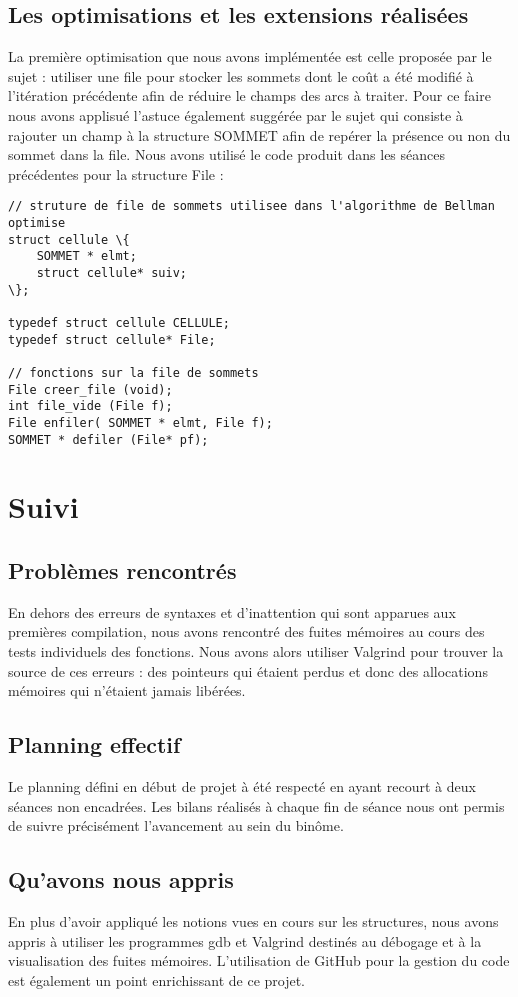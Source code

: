 \documentclass{report}
\begin{document}
\section{Les optimisations et les extensions réalisées}
La première optimisation que nous avons implémentée est celle proposée par le sujet : utiliser une file pour stocker les sommets dont le coût a été modifié à l'itération précédente afin de réduire le champs des arcs à traiter. Pour ce faire nous avons applisué l'astuce également suggérée par le sujet qui consiste à rajouter un champ à la structure SOMMET afin de repérer la présence ou non du sommet dans la file.
Nous avons utilisé le code produit dans les séances précédentes pour la structure File : 
\begin{lstlisting}
// struture de file de sommets utilisee dans l'algorithme de Bellman optimise
struct cellule \{
	SOMMET * elmt;
	struct cellule* suiv;
\};

typedef struct cellule CELLULE;
typedef struct cellule* File;

// fonctions sur la file de sommets
File creer_file (void);
int file_vide (File f);
File enfiler( SOMMET * elmt, File f);
SOMMET * defiler (File* pf);
\end{lstlisting}
\chapter{Suivi}
\section{Problèmes rencontrés}
En dehors des erreurs de syntaxes et d'inattention  qui sont apparues aux premières compilation, nous avons rencontré des fuites mémoires au cours des tests individuels des fonctions. Nous avons alors utiliser Valgrind pour trouver la source de ces erreurs : des pointeurs qui étaient perdus et donc des allocations mémoires qui n'étaient jamais libérées.

\section{Planning effectif}
Le planning défini en début de projet à été respecté en ayant recourt à deux séances non encadrées. Les bilans réalisés à chaque fin de séance nous ont permis de suivre précisément l'avancement au sein du binôme.

\section{Qu'avons nous appris}
En plus d'avoir appliqué les notions vues en cours sur les structures, nous avons appris à utiliser les programmes gdb et Valgrind destinés au débogage et à la visualisation des fuites mémoires.  L'utilisation de GitHub pour la gestion du code est également un point enrichissant de ce projet.
\end{document}
